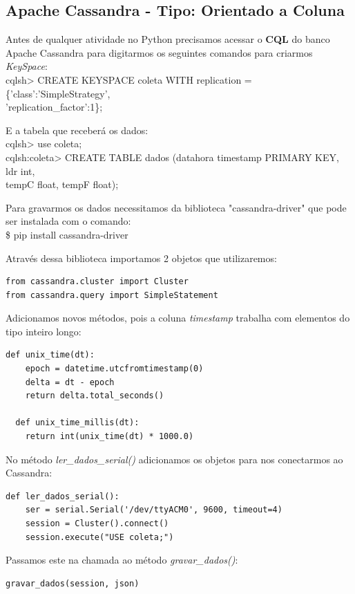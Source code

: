 \documentclass[a4paper,11pt]{article}
\begin{document}
\subsection*{Apache Cassandra - Tipo: Orientado a Coluna}
Antes de qualquer atividade no Python precisamos acessar o \textbf{CQL} do banco Apache Cassandra para digitarmos os seguintes comandos para criarmos \textit{KeySpace}: \\
{\ttfamily cqlsh> CREATE KEYSPACE coleta WITH replication = \{'class':'SimpleStrategy', \\ 'replication\_factor':1\};} 

E a tabela que receberá os dados: \\
{\ttfamily cqlsh> use coleta;} \\
{\ttfamily cqlsh:coleta> CREATE TABLE dados (datahora timestamp PRIMARY KEY, ldr int, \\ tempC float, tempF float);}

Para gravarmos os dados necessitamos da biblioteca "cassandra-driver" que pode ser instalada com o comando: \\
{\ttfamily\$ pip install cassandra-driver}

Através dessa biblioteca importamos 2 objetos que utilizaremos:
\begin{lstlisting}[]
from cassandra.cluster import Cluster
from cassandra.query import SimpleStatement
\end{lstlisting}

Adicionamos novos métodos, pois a coluna \textit{timestamp} trabalha com elementos do tipo inteiro longo:
\begin{lstlisting}[]
  def unix_time(dt):
    epoch = datetime.utcfromtimestamp(0)
    delta = dt - epoch
    return delta.total_seconds()
	
  def unix_time_millis(dt):
    return int(unix_time(dt) * 1000.0)
\end{lstlisting}

No método \textit{ler\_dados\_serial()} adicionamos os objetos para nos conectarmos ao Cassandra:
\begin{lstlisting}[]
  def ler_dados_serial():
	ser = serial.Serial('/dev/ttyACM0', 9600, timeout=4)
	session = Cluster().connect()
	session.execute("USE coleta;")
\end{lstlisting}

Passamos este na chamada ao método \textit{gravar\_dados()}:
\begin{lstlisting}[]
	gravar_dados(session, json)
\end{lstlisting}
\end{document}
